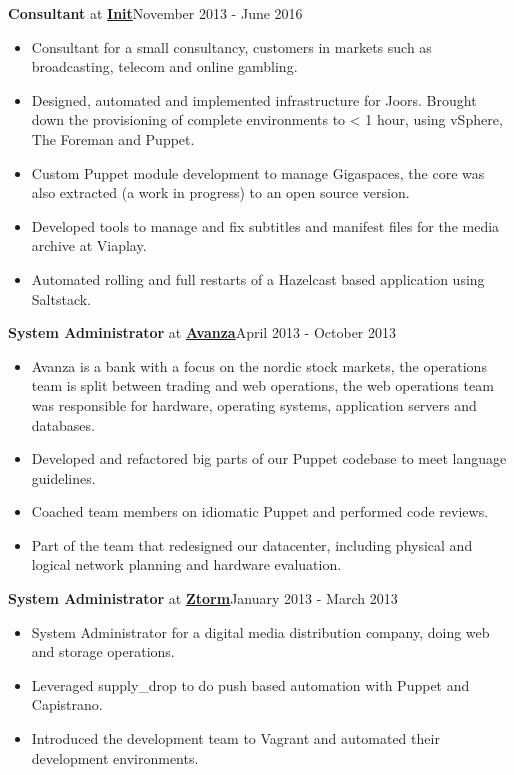 \documentclass[8pt]{article}
\newenvironment{outerlist}[1][\enskip\textbullet]%
        {\begin{itemize}[#1]}{\end{itemize}%
         \vspace{-.6\baselineskip}}
\newcommand{\blankline}{\quad\pagebreak[2]}
\begin{document}
\textbf{Consultant} at \href{http://www.init.se}{\textbf{Init}}\hfill {November 2013 - June 2016}
\begin{outerlist}
\item[] Consultant for a small consultancy, customers in markets such as broadcasting, telecom and online gambling.

	\item Designed, automated and implemented infrastructure for Joors. Brought down the provisioning of complete environments to < 1 hour,
		using vSphere, The Foreman and Puppet.
	\item Custom Puppet module development to manage Gigaspaces, the core was also extracted (a work in progress) to an open source
		version.
	\item Developed tools to manage and fix subtitles and manifest files for the media archive at Viaplay.
	\item Automated rolling and full restarts of a Hazelcast based application using Saltstack.
\end{outerlist}
\blankline

\textbf{System Administrator} at \href{http://www.avanza.se}{\textbf{Avanza}}\hfill {April 2013 - October 2013}
\begin{outerlist}
\item[] Avanza is a bank with a focus on the nordic stock markets, the operations team is split between trading and web operations, the web
	operations team was responsible for hardware, operating systems, application servers and databases.

	\item Developed and refactored big parts of our Puppet codebase to meet language guidelines.
	\item Coached team members on idiomatic Puppet and performed code reviews.
	\item Part of the team that redesigned our datacenter, including physical and logical network planning and hardware evaluation.

\end{outerlist}
\blankline

\textbf{System Administrator} at \href{http://www.ztorm.com}{\textbf{Ztorm}}\hfill {January 2013 - March 2013}
\begin{outerlist}
\item[] System Administrator for a digital media distribution company, doing web and storage operations. 

	\item Leveraged supply\_drop to do push based automation with Puppet and Capistrano.
	\item Introduced the development team to Vagrant and automated their development environments.
\end{outerlist}
\blankline
\end{document}
